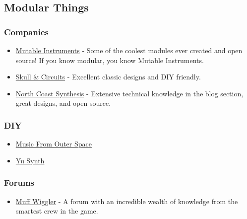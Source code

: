 \documentclass{article}
\begin{document}
\subsection{Modular Things}

\subsubsection{Companies}
\begin{itemize}
	\item \href{https://mutable-instruments.net}{Mutable Instruments} - Some of the coolest modules ever created and open source! If you know modular, you know Mutable Instruments.
	\item \href{https://www.skullandcircuits.com}{Skull \& Circuits} - Excellent classic designs and DIY friendly.
	\item \href{https://northcoastsynthesis.com}{North Coast Synthesis} - Extensive technical knowledge in the blog section, great designs, and open source.
\end{itemize}

\subsubsection{DIY}
\begin{itemize}
	\item \href{URL}{Music From Outer Space}
	\item \href{URL}{Yu Synth}
\end{itemize}

\subsubsection{Forums}
\begin{itemize}
	\item \href{https://www.muffwiggler.com/forum/index.php}{Muff Wiggler} - A forum with an incredible wealth of knowledge from the smartest crew in the game.
\end{itemize}
\end{document}
